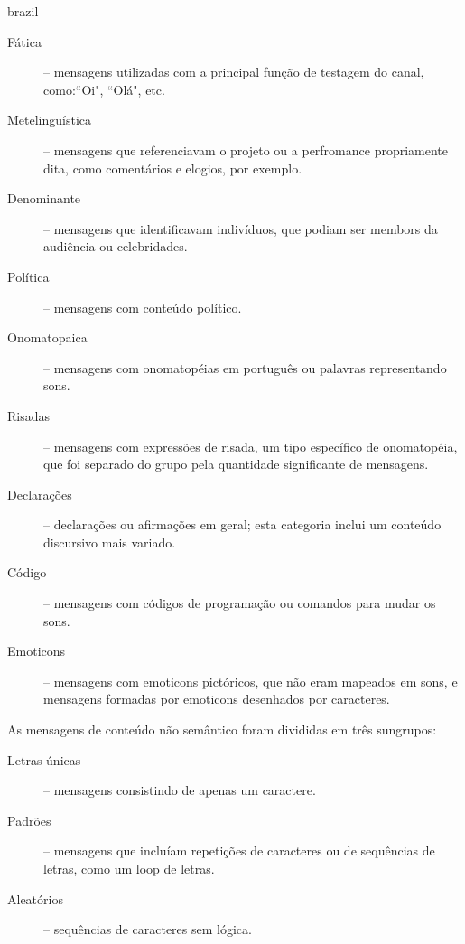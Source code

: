 \begin{otherlanguage*}{brazil}
\begin{description}
\item[Fática] -- mensagens utilizadas com a principal função de testagem do canal, como:``Oi", ``Olá", etc.
\item[Metelinguística] -- mensagens que referenciavam o projeto ou a perfromance propriamente dita, como comentários e elogios, por exemplo.
\item[Denominante] -- mensagens que identificavam indivíduos, que podiam ser membors da audiência ou celebridades.
\item[Política] -- mensagens com conteúdo político.
\item[Onomatopaica] -- mensagens com onomatopéias em português ou palavras representando sons.
\item[Risadas] -- mensagens com expressões de risada, um tipo específico de onomatopéia, que foi separado do grupo pela quantidade significante de mensagens. 
\item[Declarações] -- declarações ou afirmações em geral; esta categoria inclui um conteúdo discursivo mais variado.
\item[Código] -- mensagens com códigos de programação ou comandos para mudar os sons.
\item[Emoticons] -- mensagens com emoticons pictóricos, que não eram mapeados em sons, e mensagens formadas por emoticons desenhados por caracteres.
\end{description}

As mensagens de conteúdo não semântico foram divididas em três sungrupos:

\begin{description}
\item[Letras únicas] -- mensagens consistindo de apenas um caractere.
\item[Padrões] -- mensagens que incluíam repetições de caracteres ou de sequências de letras, como um loop de letras.
\item[Aleatórios] -- sequências de caracteres sem lógica.
\end{description}


\end{otherlanguage*}

